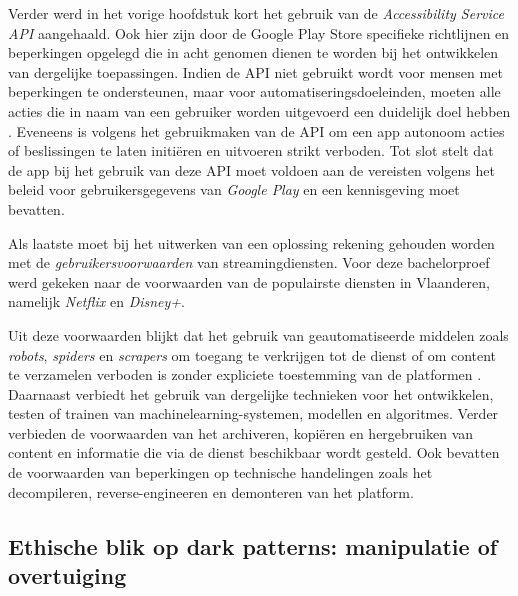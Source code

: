 \pagebreak

Verder werd in het vorige hoofdstuk kort het gebruik van de \textit{Accessibility Service API} aangehaald. Ook hier zijn door de Google Play Store specifieke richtlijnen en beperkingen opgelegd die in acht genomen dienen te worden bij het ontwikkelen van dergelijke toepassingen. Indien de API niet gebruikt wordt voor mensen met beperkingen te ondersteunen, maar voor automatiseringsdoeleinden, moeten alle acties die in naam van een gebruiker worden uitgevoerd een duidelijk doel hebben \autocite{Google}. Eveneens is volgens \textcite{Google} het gebruikmaken van de API om een app autonoom acties of beslissingen te laten initiëren en uitvoeren strikt verboden. Tot slot stelt \textcite{Google} dat de app bij het gebruik van deze API moet voldoen aan de vereisten volgens het beleid voor gebruikersgegevens van \textit{Google Play} en een kennisgeving moet bevatten.

\vspace{1em}

Als laatste moet bij het uitwerken van een oplossing rekening gehouden worden met de \textit{gebruikersvoorwaarden} van streamingdiensten. Voor deze bachelorproef werd gekeken naar de voorwaarden van de populairste diensten in Vlaanderen, namelijk \textit{Netflix} en \textit{Disney+}. 

\vspace{1em}

Uit deze voorwaarden blijkt dat het gebruik van geautomatiseerde middelen zoals \textit{robots}, \textit{spiders} en \textit{scrapers} om toegang te verkrijgen tot de dienst of om content te verzamelen verboden is zonder expliciete toestemming van de platformen \autocite{Netflix2025, WDC2026}. Daarnaast verbiedt \textcite{Netflix2025} het gebruik van dergelijke technieken voor het ontwikkelen, testen of trainen van machinelearning-systemen, modellen en algoritmes. Verder verbieden de voorwaarden van \textcite{Netflix2025} het archiveren, kopiëren en hergebruiken van content en informatie die via de dienst beschikbaar wordt gesteld. Ook bevatten de voorwaarden van \textcite{WDC2026} beperkingen op technische handelingen zoals het decompileren, reverse-engineeren en demonteren van het platform.

\vspace{1em}

\subsection{Ethische blik op dark patterns: manipulatie of overtuiging}
\label{subsec:ethiek}

